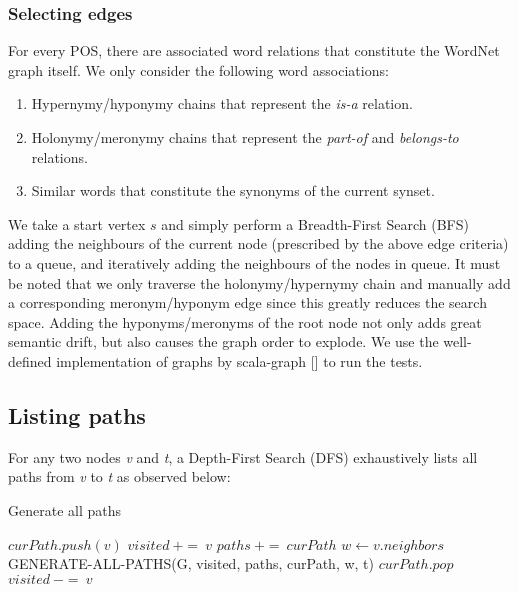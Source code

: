 \subsubsection{Selecting edges}
For every POS, there are associated word relations that constitute the WordNet graph itself. We 
only consider the following word associations: 

\begin{enumerate}
\item Hypernymy/hyponymy chains that represent the \emph{is-a} relation.
\item Holonymy/meronymy chains that represent the \emph{part-of} and \emph{belongs-to} relations.
\item Similar words that constitute the synonyms of the current synset.
\end{enumerate}

We take a start vertex $s$ and simply perform a Breadth-First Search (BFS) adding the neighbours of
the current node (prescribed by the above edge criteria) to a queue, and iteratively adding the
neighbours of the nodes in queue. It must be noted that we only traverse the holonymy/hypernymy
chain and manually add a corresponding meronym/hyponym edge since this greatly reduces the search
space. Adding the hyponyms/meronyms of the root node not only adds great semantic drift, but 
also causes the graph order to explode. We use the well-defined implementation of graphs by
scala-graph [\cite{scala-graph}] to run the tests.

\subsection{Listing paths}
For any two nodes \emph{v} and \emph{t}, a Depth-First Search (DFS) exhaustively lists
all paths from \emph{v} to \emph{t} as observed below:

\begin{algorithm}
\caption{Generate all paths}
  \begin{algorithmic}[1]
    \State $curPath.push(v)$
    \State $visited\ +=\ v$
      \State $paths\ +=\ curPath$
      \Else 
        \State $w \gets v.neighbors$
            \State GENERATE-ALL-PATHS(G, visited, paths, curPath, w, t)
          \EndIf
    \EndIf
    \State $curPath.pop$
    \State $visited\ -=\ v$
    \EndProcedure
  \end{algorithmic}
\end{algorithm}

